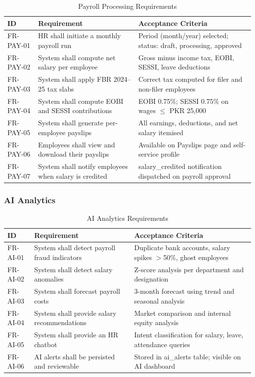 \documentclass[12pt,a4paper]{report}
\begin{document}
\begin{table}[H]
\centering
\caption{Payroll Processing Requirements}
\label{tab:payroll_req}
\begin{tabular}{|p{2.2cm}|p{5cm}|p{5cm}|}
\hline
\textbf{ID} & \textbf{Requirement} & \textbf{Acceptance Criteria} \\
\hline
FR-PAY-01 & HR shall initiate a monthly payroll run & Period (month/year) selected; status: draft, processing, approved \\
\hline
FR-PAY-02 & System shall compute net salary per employee & Gross minus income tax, EOBI, SESSI, leave deductions \\
\hline
FR-PAY-03 & System shall apply FBR 2024--25 tax slabs & Correct tax computed for filer and non-filer employees \\
\hline
FR-PAY-04 & System shall compute EOBI and SESSI contributions & EOBI 0.75\%; SESSI 0.75\% on wages $\leq$ PKR 25,000 \\
\hline
FR-PAY-05 & System shall generate per-employee payslips & All earnings, deductions, and net salary itemised \\
\hline
FR-PAY-06 & Employees shall view and download their payslips & Available on Payslips page and self-service profile \\
\hline
FR-PAY-07 & System shall notify employees when salary is credited & salary\_credited notification dispatched on payroll approval \\
\hline
\end{tabular}
\end{table}

\subsubsection{AI Analytics}

\begin{table}[H]
\centering
\caption{AI Analytics Requirements}
\label{tab:ai_req}
\begin{tabular}{|p{2.2cm}|p{5cm}|p{5cm}|}
\hline
\textbf{ID} & \textbf{Requirement} & \textbf{Acceptance Criteria} \\
\hline
FR-AI-01 & System shall detect payroll fraud indicators & Duplicate bank accounts, salary spikes $>$50\%, ghost employees \\
\hline
FR-AI-02 & System shall detect salary anomalies & Z-score analysis per department and designation \\
\hline
FR-AI-03 & System shall forecast payroll costs & 3-month forecast using trend and seasonal analysis \\
\hline
FR-AI-04 & System shall provide salary recommendations & Market comparison and internal equity analysis \\
\hline
FR-AI-05 & System shall provide an HR chatbot & Intent classification for salary, leave, attendance queries \\
\hline
FR-AI-06 & AI alerts shall be persisted and reviewable & Stored in ai\_alerts table; visible on AI dashboard \\
\hline
\end{tabular}
\end{table}
\end{document}
